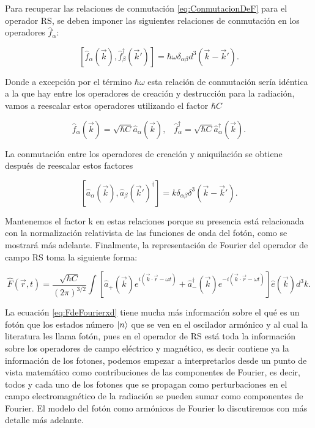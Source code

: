             Para recuperar las relaciones de conmutación \ref{eq:ConmutacionDeF} para el operador RS, se deben imponer las siguientes relaciones de conmutación en los operadores $\hat{f}_{\alpha}$:

            \begin{equation}
                \left[ \hat{f}_{\alpha}(\Vec{k}) , \hat{f}_{\beta}^{\dagger}(\Vec{k}') \right] = \hbar\omega \delta_{\alpha\beta}d^3(\Vec{k}-\Vec{k}').
            \end{equation}

            Donde a excepción por el término $\hbar\omega$ esta relación de conmutación sería idéntica a la que hay entre los operadores de creación y destrucción para la radiación, vamos a reescalar estos operadores utilizando el factor $\hbar C$

            \begin{equation}
                \hat{f}_{\alpha}(\Vec{k}) = \sqrt{\hbar C}\hat{a}_{\alpha}(\Vec{k}), \;\;\; \hat{f}_{\alpha}^{\dagger} = \sqrt{\hbar C} \hat{a}_{\alpha}^{\dagger}(\Vec{k}).
            \end{equation}

            La conmutación entre los operadores de creación y aniquilación se obtiene después de reescalar estos factores

            \begin{equation}
                \left[\hat{a}_{\alpha}(\Vec{k}) , \hat{a}_{\beta}(\Vec{k}')^{\dagger}\right] = k \delta_{\alpha\beta}\delta^3(\Vec{k}-\Vec{k}').
            \end{equation}

            Mantenemos el factor k en estas relaciones porque su presencia está relacionada con la normalización relativista de las funciones de onda del fotón, como se mostrará más adelante. Finalmente, la representación de Fourier del operador de campo RS toma la siguiente forma:

            \begin{equation}\label{eq:FdeFourierxd}
                \hat{F}(\Vec{r},t) =  \frac{\sqrt{\hbar C}}{(2\pi)^{3/2}}\int \left[\hat{a}_+(\Vec{k})e^{i(\Vec{k}\cdot \Vec{r} - \omega t)} + \hat{a}_-^{\dagger}(\Vec{k})e^{-i(\Vec{k}\cdot \Vec{r} - \omega t)}\right]\hat{e}(\Vec{k})d^3k.
            \end{equation}

            La ecuación \ref{eq:FdeFourierxd} tiene mucha más información sobre el qué es un fotón que los estados número $\ket{n}$ que se ven en el oscilador armónico y al cual la literatura les llama fotón, pues en el operador de RS está toda la información sobre los operadores de campo eléctrico y magnético, es decir contiene ya la información de los fotones, podemos empezar a interpretarlos desde un punto de vista matemático como contribuciones de las componentes de Fourier, es decir, todos y cada uno de los fotones que se propagan como perturbaciones en el campo electromagnético de la radiación se pueden sumar como componentes de Fourier. El modelo del fotón como armónicos de Fourier lo discutiremos con más detalle más adelante. \\

